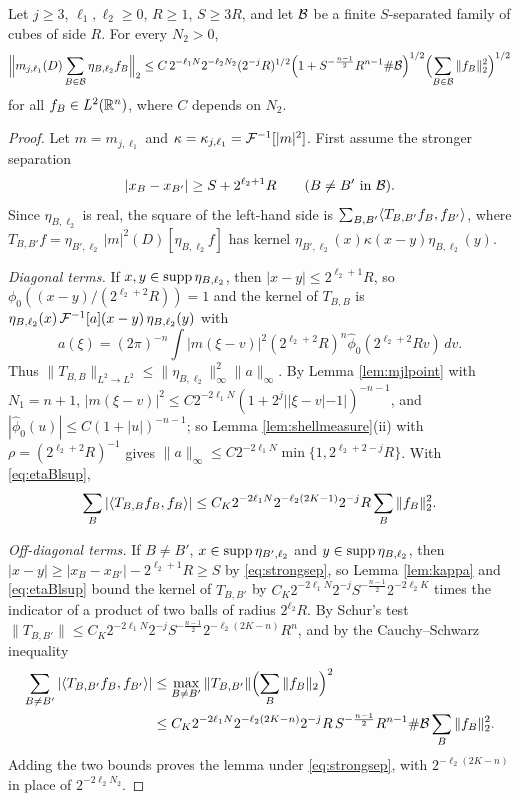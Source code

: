 \begin{lemma}\label{lem:TT}
Let $j\ge3$, $\ell_1,\ell_2\ge0$, $R\ge1$, $S\ge3R$, and let $\mathcal B$ be a finite $S$-separated family of cubes
of side $R$. For every $N_2>0$,
\[
\Bigl\|m_{j,\ell_1}(D)\sum_{B\in\mathcal B}\eta_{B,\ell_2}f_B\Bigr\|_2\le C\,2^{-\ell_1N}2^{-\ell_2N_2}(2^{-j}R)^{1/2}
\Bigl(1+S^{-\frac{n-1}2}R^{n-1}\#\mathcal B\Bigr)^{1/2}\Bigl(\sum_{B\in\mathcal B}\|f_B\|_2^2\Bigr)^{1/2}
\]
for all $f_B\in L^2(\mathbb{R}^n)$, where $C$ depends on $N_2$.
\end{lemma}

\begin{proof}
Let $m=m_{j,\ell_1}$ and $\kappa=\kappa_{j,\ell_1}=\mathcal F^{-1}[|m|^2]$. First assume the stronger separation
\begin{equation}\label{eq:strongsep}
|x_B-x_{B'}|\ge S+2^{\ell_2+1}R\qquad(B\ne B'\text{ in }\mathcal B).
\end{equation}
Since $\eta_{B,\ell_2}$ is real, the square of the left-hand side is
$\sum_{B,B'}\langle T_{B,B'}f_B,f_{B'}\rangle$, where $T_{B,B'}f=\eta_{B',\ell_2}\,|m|^2(D)[\eta_{B,\ell_2}f]$ has kernel
$\eta_{B',\ell_2}(x)\kappa(x-y)\eta_{B,\ell_2}(y)$.

\emph{Diagonal terms.} If $x,y\in\operatorname{supp}\eta_{B,\ell_2}$, then $|x-y|\le2^{\ell_2+1}R$, so
$\phi_0((x-y)/(2^{\ell_2+2}R))=1$ and the kernel of $T_{B,B}$ is
$\eta_{B,\ell_2}(x)\,\mathcal F^{-1}[a](x-y)\,\eta_{B,\ell_2}(y)$ with
\[
a(\xi)=(2\pi)^{-n}\int|m(\xi-v)|^2(2^{\ell_2+2}R)^n\hat\phi_0(2^{\ell_2+2}Rv)\,dv .
\]
Thus $\|T_{B,B}\|_{L^2\to L^2}\le\|\eta_{B,\ell_2}\|_\infty^2\|a\|_\infty$. By Lemma \ref{lem:mjlpoint} with
$N_1=n+1$, $|m(\xi-v)|^2\le C2^{-2\ell_1N}(1+2^j||\xi-v|-1|)^{-n-1}$, and $|\hat\phi_0(u)|\le C(1+|u|)^{-n-1}$; so
Lemma \ref{lem:shellmeasure}(ii) with $\rho=(2^{\ell_2+2}R)^{-1}$ gives
$\|a\|_\infty\le C2^{-2\ell_1N}\min\{1,2^{\ell_2+2-j}R\}$. With \eqref{eq:etaBlsup},
\[
\sum_{B}|\langle T_{B,B}f_B,f_B\rangle|\le C_K2^{-2\ell_1N}2^{-\ell_2(2K-1)}2^{-j}R\sum_B\|f_B\|_2^2 .
\]

\emph{Off-diagonal terms.} If $B\ne B'$, $x\in\operatorname{supp}\eta_{B',\ell_2}$ and $y\in\operatorname{supp}\eta_{B,\ell_2}$, then
$|x-y|\ge|x_B-x_{B'}|-2^{\ell_2+1}R\ge S$ by \eqref{eq:strongsep}, so Lemma \ref{lem:kappa} and
\eqref{eq:etaBlsup} bound the kernel of $T_{B,B'}$ by
$C_K2^{-2\ell_1N}2^{-j}S^{-\frac{n-1}2}2^{-2\ell_2K}$ times the indicator of a product of two balls of radius
$2^{\ell_2}R$. By Schur's test
$\|T_{B,B'}\|\le C_K2^{-2\ell_1N}2^{-j}S^{-\frac{n-1}2}2^{-\ell_2(2K-n)}R^n$, and by the Cauchy--Schwarz
inequality
\begin{align*}
\sum_{B\ne B'}|\langle T_{B,B'}f_B,f_{B'}\rangle|&\le\max_{B\ne B'}\|T_{B,B'}\|\Bigl(\sum_B\|f_B\|_2\Bigr)^2\\
&\le C_K2^{-2\ell_1N}2^{-\ell_2(2K-n)}2^{-j}R\,S^{-\frac{n-1}2}R^{n-1}\#\mathcal B\sum_B\|f_B\|_2^2 .
\end{align*}
Adding the two bounds proves the lemma under \eqref{eq:strongsep}, with $2^{-\ell_2(2K-n)}$ in place of
$2^{-2\ell_2N_2}$.


\end{proof}
